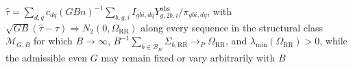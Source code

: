 \(\widehat\tau=\sum_{d,q}c_{dq}(GBn)^{-1}\sum_{b,g,i}I_{gbi,dq}Y^{\mathrm{obs}}_{g,2b,i}/\pi_{gbi,dq}\), with \(\sqrt{GB}(\widehat\tau-\tau)\Rightarrow N_2(0,\Omega_{\mathrm{RR}})\) along every sequence in the structural class \(\mathcal M_{G,B}\) for which \(B\to\infty\), \(B^{-1}\sum_{b\in\mathcal B_B}\Sigma_{b,\mathrm{RR}}\to_P\Omega_{\mathrm{RR}}\), and \(\lambda_{\min}(\Omega_{\mathrm{RR}})>0\), while the admissible even \(G\) may remain fixed or vary arbitrarily with \(B\)